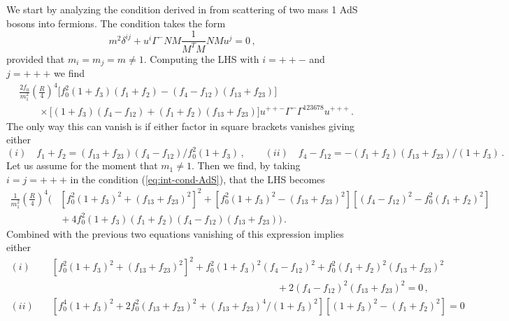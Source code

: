 \documentclass[a4paper,11pt]{article}
\begin{document}
We start by analyzing the condition derived in \cite{Wulff:2017lxh} from scattering of two mass 1 AdS bosons into fermions. The condition takes the form
\begin{equation}
m^2\delta^{ij}+u^i\Gamma^-NM\frac{1}{M^TM}NMu^j=0\,,
\label{eq:int-cond-AdS}
\end{equation}
provided that $m_i=m_j=m\neq1$. Computing the LHS with $i=++-$ and $j=+++$ we find
\begin{align}
&\frac{2f_0}{m_1^2}\left(\frac{R}{4}\right)^4\big[f_0^2(1+f_3)(f_1+f_2)-(f_4-f_{12})(f_{13}+f_{23})\big]
\nonumber\\
&\qquad\times
\big[(1+f_3)(f_4-f_{12})+(f_1+f_2)(f_{13}+f_{23})\big]u^{++-}\Gamma^-\Gamma^{123678}u^{+++}\,.
\end{align}
The only way this can vanish is if either factor in square brackets vanishes giving either
\begin{equation}
(i)\quad f_1+f_2=(f_{13}+f_{23})(f_4-f_{12})/f_0^2(1+f_3)\,,\qquad (ii)\quad f_4-f_{12}=-(f_1+f_2)(f_{13}+f_{23})/(1+f_3)\,.
\label{eq:cond-i-ii}
\end{equation}
Let us assume for the moment that $m_1\neq1$. Then we find, by taking $i=j=+++$ in the condition (\ref{eq:int-cond-AdS}), that the LHS becomes
\begin{align}
\frac{1}{m_1^2}\left(\frac{R}{4}\right)^4
\Big(
&
\left[f_0^2(1+f_3)^2+(f_{13}+f_{23})^2\right]^2
+\left[f_0^2(1+f_3)^2-(f_{13}+f_{23})^2\right]\left[(f_4-f_{12})^2-f_0^2(f_1+f_2)^2\right]
\nonumber\\
&{}
+4f_0^2(1+f_3)(f_1+f_2)(f_4-f_{12})(f_{13}+f_{23})
\Big)\,.
%
\end{align}
Combined with the previous two equations vanishing of this expression implies either
\begin{align}
(i)&\quad
\left[f_0^2(1+f_3)^2+(f_{13}+f_{23})^2\right]^2
+f_0^2(1+f_3)^2(f_4-f_{12})^2
+f_0^2(f_1+f_2)^2(f_{13}+f_{23})^2
\nonumber\\
&\qquad\qquad\qquad\qquad\qquad\qquad\qquad\qquad\qquad\qquad\qquad\qquad
+2(f_4-f_{12})^2(f_{13}+f_{23})^2
=0
\,,\nonumber\\
(ii)&\quad
\left[
f_0^4(1+f_3)^2
+2f_0^2(f_{13}+f_{23})^2
+(f_{13}+f_{23})^4/(1+f_3)^2
\right]
\left[(1+f_3)^2-(f_1+f_2)^2\right]
=0
\end{align}
\end{document}
